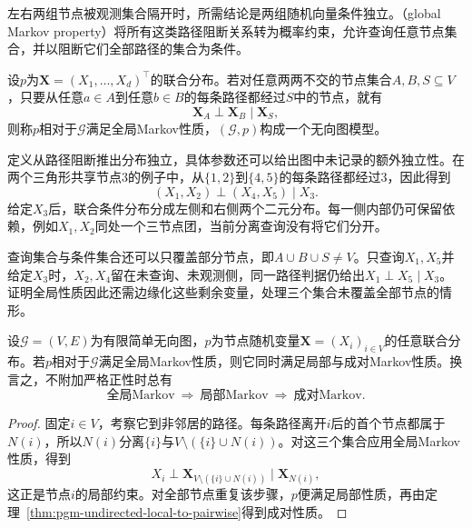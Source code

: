 左右两组节点被观测集合隔开时，所需结论是两组随机向量条件独立。（global Markov property）将所有这类路径阻断关系转为概率约束，允许查询任意节点集合，并以阻断它们全部路径的集合为条件。

\begin{definition}[全局Markov性质]
  \label{def:pgm-undirected-model}
  设$p$为$\bm{X}=(X_1,\ldots,X_d)^{\top}$的联合分布。若对任意两两不交的节点集合$A,B,S\subseteq V$，只要从任意$a\in A$到任意$b\in B$的每条路径都经过$S$中的节点，就有
  \begin{equation}
    \bm{X}_A\perp\bm{X}_B\mid\bm{X}_S,
    \label{eq:pgm-undirected-global}
  \end{equation}
  则称$p$相对于$\mathcal{G}$满足全局Markov性质，$(\mathcal{G},p)$构成一个无向图模型。
\end{definition}

定义从路径阻断推出分布独立，具体参数还可以给出图中未记录的额外独立性。在两个三角形共享节点$3$的例子中，从$\{1,2\}$到$\{4,5\}$的每条路径都经过$3$，因此得到
\[
  (X_1,X_2)\perp(X_4,X_5)\mid X_3.
\]
给定$X_3$后，联合条件分布分成左侧和右侧两个二元分布。每一侧内部仍可保留依赖，例如$X_1,X_2$同处一个三节点团，当前分离查询没有将它们分开。

查询集合与条件集合还可以只覆盖部分节点，即$A\cup B\cup S\neq V$。只查询$X_1,X_5$并给定$X_3$时，$X_2,X_4$留在未查询、未观测侧，同一路径判据仍给出$X_1\perp X_5\mid X_3$。证明全局性质因此还需边缘化这些剩余变量，处理三个集合未覆盖全部节点的情形。

\begin{theorem}[全局Markov性质蕴含局部与成对Markov性质]
  \label{thm:pgm-undirected-global-implications}
  设$\mathcal{G}=(V,E)$为有限简单无向图，$p$为节点随机变量$\bm{X}=(X_i)_{i\in V}$的任意联合分布。若$p$相对于$\mathcal{G}$满足全局Markov性质，则它同时满足局部与成对Markov性质。换言之，不附加严格正性时总有
  \begin{equation}
    \text{全局Markov}
    \ \Longrightarrow\ \text{局部Markov}
    \ \Longrightarrow\ \text{成对Markov}.
    \label{eq:pgm-undirected-implication}
  \end{equation}
\end{theorem}

\begin{proof}
固定$i\in V$，考察它到非邻居的路径。每条路径离开$i$后的首个节点都属于$N(i)$，所以$N(i)$分离$\{i\}$与$V\setminus(\{i\}\cup N(i))$。对这三个集合应用全局Markov性质，得到
\[
  X_i\perp\bm{X}_{V\setminus(\{i\}\cup N(i))}
  \mid\bm{X}_{N(i)},
\]
这正是节点$i$的局部约束。对全部节点重复该步骤，$p$便满足局部性质，再由定理~\ref{thm:pgm-undirected-local-to-pairwise}得到成对性质。
\end{proof}

